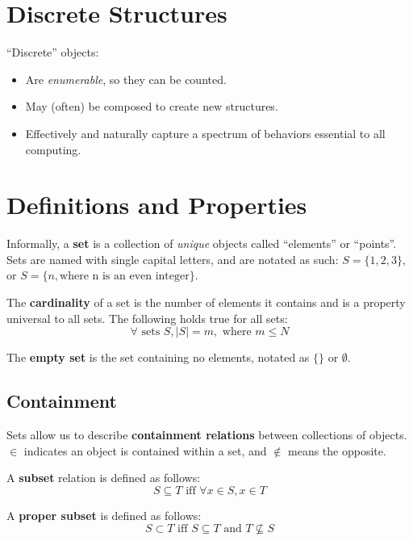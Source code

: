 \documentclass[11pt]{article}
\begin{document}
\section{Discrete Structures}
	``Discrete'' objects:
	\begin{itemize}
		\item Are \textit{enumerable}, so they can be counted.
		\item May (often) be composed to create new structures.
		\item Effectively and naturally capture a spectrum of behaviors essential to all computing.
	\end{itemize}
	
\section{Definitions and Properties}
	Informally, a \textbf{set} is a collection of \textit{unique} objects called ``elements'' or ``points''. Sets are named with single capital letters, and are notated as such: $S=\{1,2,3\}$, or $S = \{n, \text{where n is an even integer}\}$.
	
	The \textbf{cardinality} of a set is the number of elements it contains and is a property universal to all sets. The following holds true for all sets:
	\begin{equation}
		\forall \text{ sets } S, |S|=m, \text{ where } m\leq N
	\end{equation}
	
	The \textbf{empty set} is the set containing no elements, notated as $\{\}$ or $\emptyset$.
	
	\subsection{Containment}
		Sets allow us to describe \textbf{containment relations} between collections of objects. $\in$ indicates an object is contained within a set, and $\notin$ means the opposite.
		
		A \textbf{subset} relation is defined as follows: 
		\begin{equation}
			S\subseteq T \text{ iff } \forall x\in S, x\in T
		\end{equation}
		
		A \textbf{proper subset} is defined as follows:
		\begin{equation}
			S\subset T \text { iff } S\subseteq T \text{ and } T\not\subseteq S
		\end{equation}
		
\end{document}

